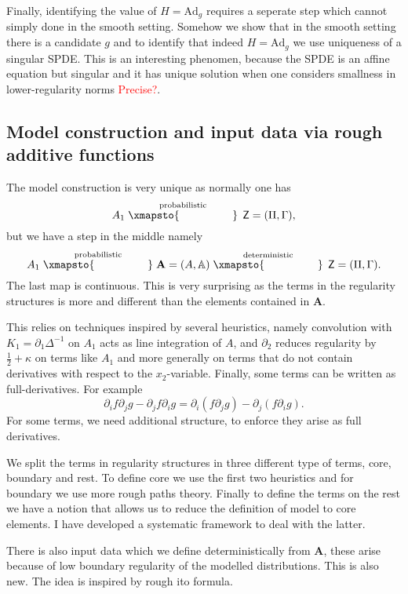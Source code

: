 \documentclass[12pt]{article}
\numberwithin{equation}{section}
\theoremstyle{definition}
\theoremstyle{remark}
\newcommand{\Ad}{\mathrm{Ad}}
\newcommand{\1}{\mathbf 1}
\newcommand{\<}{\langle}
\renewcommand{\>}{\rangle}
\newcommand{\red}[1]{\textcolor{red}{#1}}
\newcommand{\bfA}{\mathbf A}
\newcommand{\bA}{\mathbb A}
\newcommand{\sfZ}{\mathsf Z}
\begin{document}
Finally, identifying the value of $H=\Ad_g$ requires a seperate step which cannot simply done in the smooth setting. Somehow we show that in the smooth setting there is a candidate $g$ and to identify that indeed $H=\Ad_g$ we use uniqueness of a singular SPDE. This is an interesting phenomen, because the SPDE is an affine equation but singular and it has unique solution when one considers smallness in lower-regularity norms \red{Precise?}. 


\subsection{Model construction and input data via rough additive functions}
The model construction is very unique as normally one has 
$$
A_1\stackrel{\text{probabilistic}}{\xmapsto{\hspace{1.7cm}}} \,\sfZ=(\Pi,\Gamma),
$$
but we have a step in the middle namely 
$$A_1\stackrel{\text{probabilistic}}{\xmapsto{\hspace{1.7cm}}} \bfA=(A,\bA) \stackrel{\text{deterministic}}{\xmapsto{\hspace{1.7cm}}} \,\sfZ=(\Pi,\Gamma).$$
The last map is continuous. This is very surprising as the terms in the regularity structures is more and different than the elements contained in $\bfA$. 

This relies on techniques inspired by several heuristics, namely convolution with $K_1=\partial_1 \Delta^{-1}$ on $A_1$ acts as line integration of $A$, and $\partial_2$ reduces regularity by $\frac 1 2+\kappa$ on terms like $A_1$ and more generally on terms that do not contain derivatives with respect to the $x_2$-variable. Finally, some terms can be written as full-derivatives. For example
\[
\partial_i f\partial_j g-\partial_j f\partial_i g=\partial_i (f\partial_j g)-\partial_j (f\partial_i g). 
\]
For some terms, we need additional structure, to enforce they arise as full derivatives. 

We split the terms in regularity structures in three different type of terms, core, boundary and rest. To define core we use the first two heuristics and for boundary we use more rough paths theory. Finally to define the terms on the rest we have a notion that allows us to reduce the definition of model to core elements. I have developed a systematic framework to deal with the latter. 

There is also input data which we define deterministically from $\bfA$, these arise because of low boundary regularity of the modelled distributions. This is also new. The idea is inspired by rough ito formula.  
\end{document}
